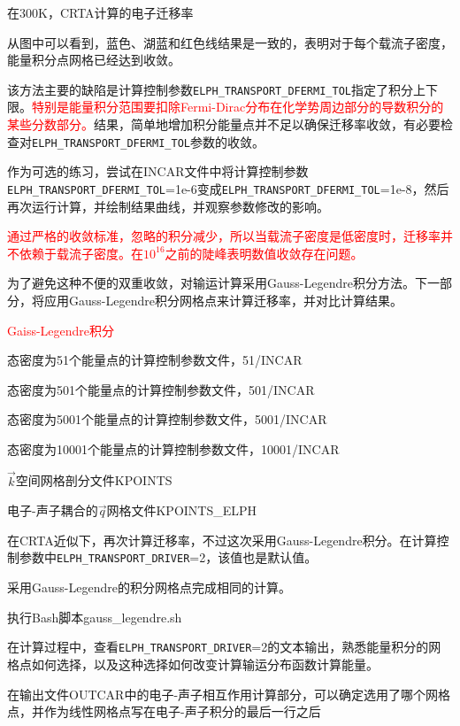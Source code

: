 在\textrm{300K}，\textrm{CRTA}计算的电子迁移率

从图中可以看到，蓝色、湖蓝和红色线结果是一致的，表明对于每个载流子密度，能量积分点网格已经达到收敛。

该方法主要的缺陷是计算控制参数\texttt{ELPH\_TRANSPORT\_DFERMI\_TOL}指定了积分上下限。\textcolor{red}{特别是能量积分范围要扣除\textrm{Fermi-Dirac}分布在化学势周边部分的导数积分的某些分数部分。}结果，简单地增加积分能量点并不足以确保迁移率收敛，有必要检查对\texttt{ELPH\_TRANSPORT\_DFERMI\_TOL}参数的收敛。

作为可选的练习，尝试在\textrm{INCAR}文件中将计算控制参数\texttt{ELPH\_TRANSPORT\_DFERMI\_TOL}=\textrm{1e-6}变成\texttt{ELPH\_TRANSPORT\_DFERMI\_TOL}=\textrm{1e-8}，然后再次运行计算，并绘制结果曲线，并观察参数修改的影响。

\textcolor{red}{通过严格的收敛标准，忽略的积分减少，所以当载流子密度是低密度时，迁移率并不依赖于载流子密度。在$10^{16}$之前的陡峰表明数值收敛存在问题。}

为了避免这种不便的双重收敛，对输运计算采用\textrm{Gauss-Legendre}积分方法。下一部分，将应用\textrm{Gauss-Legendre}积分网格点来计算迁移率，并对比计算结果。

\textcolor{red}{\textrm{Gaiss-Legendre}积分}

态密度为51个能量点的计算控制参数文件，\textrm{51/INCAR}

态密度为501个能量点的计算控制参数文件，\textrm{501/INCAR}

态密度为5001个能量点的计算控制参数文件，\textrm{5001/INCAR}

态密度为10001个能量点的计算控制参数文件，\textrm{10001/INCAR}

$\vec k$空间网格剖分文件\textrm{KPOINTS}

电子-声子耦合的$\vec q$网格文件\textrm{KPOINTS\_ELPH}

在\textrm{CRTA}近似下，再次计算迁移率，不过这次采用\textrm{Gauss-Legendre}积分。在计算控制参数中\texttt{ELPH\_TRANSPORT\_DRIVER}=2，该值也是默认值。

采用\textrm{Gauss-Legendre}的积分网格点完成相同的计算。

执行\textrm{Bash}脚本\textrm{gauss\_legendre.sh}

在计算过程中，查看\texttt{ELPH\_TRANSPORT\_DRIVER}=2的文本输出，熟悉能量积分的网格点如何选择，以及这种选择如何改变计算输运分布函数计算能量。

在输出文件\textrm{OUTCAR}中的电子-声子相互作用计算部分，可以确定选用了哪个网格点，并作为线性网格点写在电子-声子积分的最后一行之后

